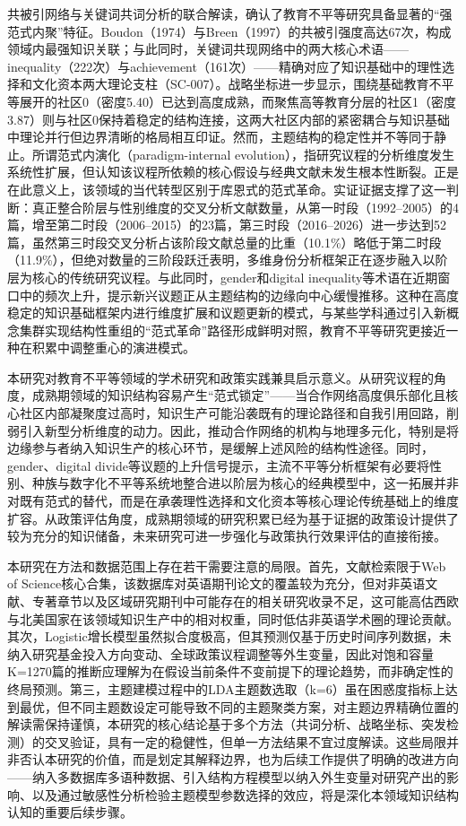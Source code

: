 \documentclass[12pt,a4paper]{article}
\begin{document}
共被引网络与关键词共词分析的联合解读，确认了教育不平等研究具备显著的“强范式内聚”特征。Boudon（1974）与Breen（1997）的共被引强度高达67次，构成领域内最强知识关联；与此同时，关键词共现网络中的两大核心术语——inequality（222次）与achievement（161次）——精确对应了知识基础中的理性选择和文化资本两大理论支柱（SC-007）。战略坐标进一步显示，围绕基础教育不平等展开的社区0（密度5.40）已达到高度成熟，而聚焦高等教育分层的社区1（密度3.87）则与社区0保持着稳定的结构连接，这两大社区内部的紧密耦合与知识基础中理论并行但边界清晰的格局相互印证。然而，主题结构的稳定性并不等同于静止。所谓范式内演化（paradigm-internal evolution），指研究议程的分析维度发生系统性扩展，但认知该议程所依赖的核心假设与经典文献未发生根本性断裂。正是在此意义上，该领域的当代转型区别于库恩式的范式革命。实证证据支撑了这一判断：真正整合阶层与性别维度的交叉分析文献数量，从第一时段（1992–2005）的4篇，增至第二时段（2006–2015）的23篇，第三时段（2016–2026）进一步达到52篇，虽然第三时段交叉分析占该阶段文献总量的比重（10.1\%）略低于第二时段（11.9\%），但绝对数量的三阶段跃迁表明，多维身份分析框架正在逐步融入以阶层为核心的传统研究议程。与此同时，gender和digital inequality等术语在近期窗口中的频次上升，提示新兴议题正从主题结构的边缘向中心缓慢推移。这种在高度稳定的知识基础框架内进行维度扩展和议题更新的模式，与某些学科通过引入新概念集群实现结构性重组的“范式革命”路径形成鲜明对照，教育不平等研究更接近一种在积累中调整重心的演进模式。

本研究对教育不平等领域的学术研究和政策实践兼具启示意义。从研究议程的角度，成熟期领域的知识结构容易产生“范式锁定”——当合作网络高度俱乐部化且核心社区内部凝聚度过高时，知识生产可能沿袭既有的理论路径和自我引用回路，削弱引入新型分析维度的动力。因此，推动合作网络的机构与地理多元化，特别是将边缘参与者纳入知识生产的核心环节，是缓解上述风险的结构性途径。同时，gender、digital divide等议题的上升信号提示，主流不平等分析框架有必要将性别、种族与数字化不平等系统地整合进以阶层为核心的经典模型中，这一拓展并非对既有范式的替代，而是在承袭理性选择和文化资本等核心理论传统基础上的维度扩容。从政策评估角度，成熟期领域的研究积累已经为基于证据的政策设计提供了较为充分的知识储备，未来研究可进一步强化与政策执行效果评估的直接衔接。

本研究在方法和数据范围上存在若干需要注意的局限。首先，文献检索限于Web of Science核心合集，该数据库对英语期刊论文的覆盖较为充分，但对非英语文献、专著章节以及区域研究期刊中可能存在的相关研究收录不足，这可能高估西欧与北美国家在该领域知识生产中的相对权重，同时低估非英语学术圈的理论贡献。其次，Logistic增长模型虽然拟合度极高，但其预测仅基于历史时间序列数据，未纳入研究基金投入方向变动、全球政策议程调整等外生变量，因此对饱和容量K=1270篇的推断应理解为在假设当前条件不变前提下的理论趋势，而非确定性的终局预测。第三，主题建模过程中的LDA主题数选取（k=6）虽在困惑度指标上达到最优，但不同主题数设定可能导致不同的主题聚类方案，对主题边界精确位置的解读需保持谨慎，本研究的核心结论基于多个方法（共词分析、战略坐标、突发检测）的交叉验证，具有一定的稳健性，但单一方法结果不宜过度解读。这些局限并非否认本研究的价值，而是划定其解释边界，也为后续工作提供了明确的改进方向——纳入多数据库多语种数据、引入结构方程模型以纳入外生变量对研究产出的影响、以及通过敏感性分析检验主题模型参数选择的效应，将是深化本领域知识结构认知的重要后续步骤。
\end{document}
